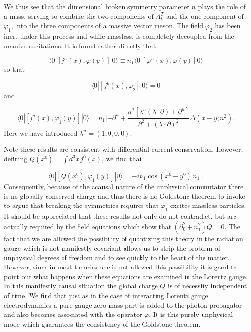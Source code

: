 \documentclass[%
  12pt,
  paper=letter,
  abstracton,
  pagesize=auto,
  version=last,
  DIV=calc
  ]{article}
\begin{document}
We thus see that the dimensional broken symmetry parameter $n$ plays
the role of a mass, serving to combine the two components of $A^T_k$
and the one component of $\varphi_1$, into the three components of a
massive vector meson.  The field $\varphi_2$ has been inert under this
process and while massless, is completely decoupled from the massive
excitations.  It is found rather directly that

\begin{equation}
\langle 0|[j^u(x), \varphi(y)]|0\rangle \equiv n_1\langle 0|[\varphi^u(x), \varphi(y)] 0\rangle
\end{equation}
so that

\begin{equation}
\langle 0|[j^u(x), \varphi_2]|0\rangle = 0
\end{equation}
and

\begin{equation}
\langle 0|[j^u(x), \varphi_1(y)]|0\rangle = n_1[-\partial^u+\frac{n^2[\lambda^u(\lambda\cdot\partial)+\partial^u]}{\partial^2+(\lambda\cdot\partial)^2}\Delta(x-y; n^2).
\end{equation}
Here we have introduced $\lambda^u=(1,0,0,0)$.

Note these results are consistent with differential current
conservation.  However, defining $Q(x^0)=\int d^3x\, j^0(x)$, we find
that

\[\langle 0|[Q(x^0), \varphi_1(y)]|0\rangle =-i n_1\cos(x^0-y^0)\,n_1 \;.\]
Consequently, because of the acausal nature of the
unphysical commutator there is no globally conserved charge and thus
there is no Goldstone theorem to invoke to argue that breaking the
symmetries requires that $\varphi_1$ excites massless particles.  It
should be appreciated that these results not only do not contradict,
but are actually required by the field equations which show that
$(\partial^2_0+n^2_1)Q=0$.  The fact that we are allowed the possibility
of quantizing this theory in the radiation gauge which is not
manifestly covariant allows us to strip the problem of unphysical
degrees of freedom and to see quickly to the heart of the matter.
However, since in most theories one is not allowed this possibility it
is good to point out what happens when these equations are examined in
the Lorentz gauge.  In this manifestly causal situation the global
charge $Q$ is of necessity independent of time.  We find that just as
in the case of interacting Lorentz gauge electrodynamics a pure gauge
zero mass part is added to the photon propagator and also becomes
associated with the operator $\varphi$.  It is this purely unphysical
mode which guarantees the consistency of the Goldstone theorem.
\end{document}
